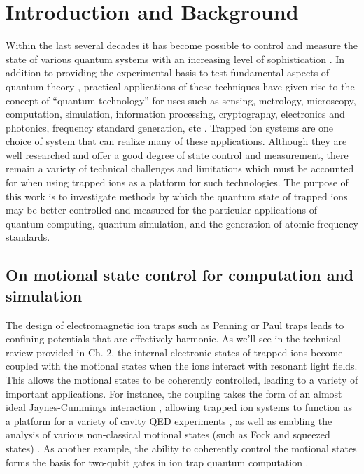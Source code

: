 \chapter{Introduction and Background}

Within the last several decades it has become possible to control and measure the state of various quantum systems with an increasing level of sophistication \cite{doi:10.1080/09500349708231863, QuantMeas}. In addition to providing the experimental basis to test fundamental aspects of quantum theory \cite{QuantTh}, practical applications of these techniques have given rise to the concept of ``quantum technology'' for uses such as sensing, metrology, microscopy, computation, simulation, information processing, cryptography, electronics and photonics, frequency standard generation, etc \cite{QuantMeas, Dowling1655}. Trapped ion systems are one choice of system that can realize many of these applications. Although they are well researched and offer a good degree of state control and measurement, there remain a variety of technical challenges and limitations which must be accounted for when using trapped ions as a platform for such technologies. The purpose of this work is to investigate methods by which the quantum state of trapped ions may be better controlled and measured for the particular applications of quantum computing, quantum simulation, and the generation of atomic frequency standards.

\section{On motional state control for computation and simulation}

The design of electromagnetic ion traps such as Penning or Paul traps leads to confining potentials that are effectively harmonic. As we'll see in the technical review provided in Ch. 2, the internal electronic states of trapped ions become coupled with the motional states when the ions interact with resonant light fields. This allows the motional states to be coherently controlled, leading to a variety of important applications. For instance, the coupling takes the form of an almost ideal Jaynes-Cummings interaction \cite{Jaynes63.IEEE.51.89}, allowing trapped ion systems to function as a platform for a variety of cavity QED experiments \cite{CavityQED,Wu97.PRL.78.3086}, as well as enabling the analysis of various non-classical motional states (such as Fock and squeezed states) \cite{PhysRevA.49.1202,PhysRevLett.76.1796}. As another example, the ability to coherently control the motional states forms the basis for two-qubit gates in ion trap quantum computation \cite{Cirac95.PRL.74.4091,Sorensen00.PRA.62.022311,Schmidt03.Nature.422.408}. 

